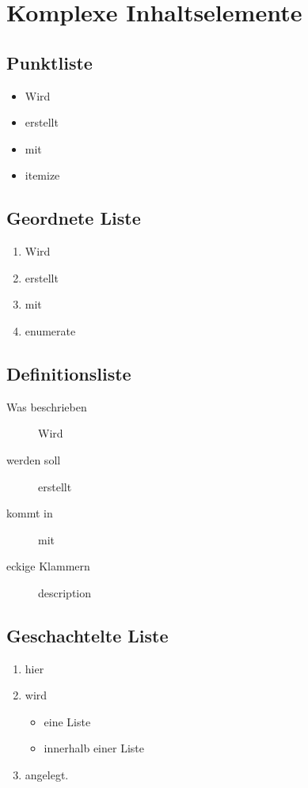 
\section{Komplexe Inhaltselemente}
\subsection{Punktliste}

\begin{itemize}
    \item Wird
    \item erstellt
    \item mit
    \item itemize
\end{itemize}

\subsection{Geordnete Liste}

\begin{enumerate}
    \item Wird
    \item erstellt
    \item mit
    \item enumerate
\end{enumerate}

\subsection{Definitionsliste}

\begin{description}
    \item [Was beschrieben] Wird
    \item [werden soll] erstellt
    \item [kommt in] mit
    \item [eckige Klammern] description
\end{description}

\subsection{Geschachtelte Liste}

\begin{enumerate}
    \item hier
    \item wird
    \begin{itemize}
        \item eine Liste
        \item innerhalb einer Liste
    \end{itemize}
    \item angelegt.
\end{enumerate}

